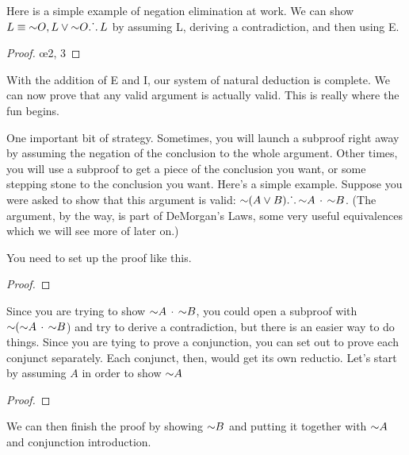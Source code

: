 Here is a simple example of negation elimination at work. We can show $L \equiv \mathord{\sim} O, L \vee \mathord{\sim} O \ldotp\dot{}\,\ldotp L$ by assuming \enot L, deriving a contradiction, and then using \enot E.

\begin{proof}
\open
	 \oe{2, 3}
	 
	 
\close
{}
\end{proof}

With the addition of \enot E and \enot I, our system of natural deduction is complete. We can now prove that any valid argument is actually valid. This is really where the fun begins. 

One important bit of strategy. Sometimes, you will launch a subproof right away by assuming the negation of the conclusion to the whole argument. Other times, you will use a subproof to get a piece of the conclusion you want, or some stepping stone to the conclusion you want. Here's a simple example. Suppose you were asked to show that this argument is valid: $\mathord{\sim}(A \vee B) \ldotp\dot{}\,\ldotp \mathord{\sim} A \,\cdot\, \mathord{\sim} B$. (The argument, by the way, is part of DeMorgan's Laws, some very useful equivalences which we will see more of later on.)

You need to set up the proof like this.

\begin{proof}
 
\end{proof}

Since you are trying to show $\mathord{\sim} A \,\cdot\, \mathord{\sim} B$, you could open a subproof with $\mathord{\sim}(\mathord{\sim} A \,\cdot\, \mathord{\sim} B$) and try to derive a contradiction, but there is an easier way to do things. Since you are tying to prove a conjunction, you can set out to prove each conjunct separately. Each conjunct, then, would get its own reductio. Let's start by assuming $A$ in order to show $\mathord{\sim} A$

\begin{proof}
 
	\open
		
	 
	 
	\close
{} 
\end{proof}


We can then finish the proof by showing $\mathord{\sim} B$ and putting it together with $\mathord{\sim} A$ and conjunction introduction. 

